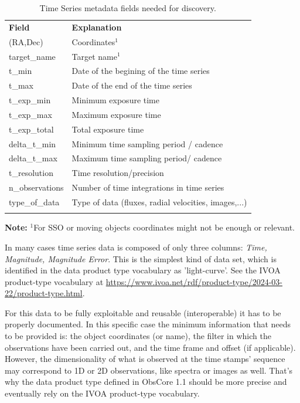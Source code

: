 \documentclass[11pt,a4paper]{ivoa}
\begin{document}
\begin{table}[hb]
  \begin{center}
  \caption{Time Series metadata fields needed for discovery.}
  \label{tab:fields}
    \begin{tabular}{p{}p{}}
      \sptablerule
      \textbf{Field}  & \textbf{Explanation}                        \\\sptablerule
      (RA,Dec)        & Coordinates$^1$                             \\
      target\_name    & Target name$^1$                             \\
      t\_min          & Date of the begining of the time series  \\
      t\_max          & Date of the end of the time series          \\
      t\_exp\_min     & Minimum exposure time                       \\
      t\_exp\_max     & Maximum exposure time                       \\
      t\_exp\_total   & Total exposure time                         \\
      delta\_t\_min   & Minimum time sampling period / cadence             \\
      delta\_t\_max   & Maximum time sampling period/ cadence             \\
      t\_resolution   & Time resolution/precision                   \\
      n\_observations & Number of time integrations  in time series         \\
      type\_of\_data  & Type of data (fluxes, radial velocities, images,...)\\
      \sptablerule
    \end{tabular}
  \end{center}
  \textbf{Note:} $^1$For SSO or moving objects coordinates might not be enough or relevant.
\end{table}

In many cases time series data is composed of only three columns: \emph{Time, Magnitude, Magnitude Error}.
This is the simplest kind of data set,  which is identified in the data product type vocabulary as 'light-curve'.
See the IVOA product-type vocabulary at \url{https://www.ivoa.net/rdf/product-type/2024-03-22/product-type.html}.

For this data to be fully exploitable and reusable (interoperable) it has to be properly documented. In this specific case the minimum information that needs to be provided is: the object coordinates (or name), the filter in which the observations have been carried out, and the time frame and offset (if applicable).
However, the dimensionality of what is observed at the time stamps' sequence may correspond to 1D or 2D observations, like spectra or images  as well.
That's why the data product type  defined in ObsCore 1.1 should be more precise and eventually rely on the IVOA product-type vocabulary.
\end{document}
